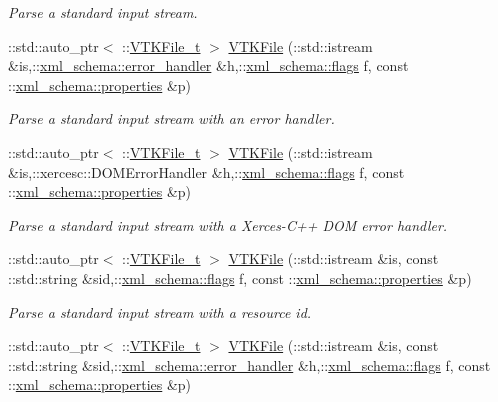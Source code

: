 \begin{DoxyCompactItemize}
\begin{DoxyCompactList}\small\item\em Parse a standard input stream. \end{DoxyCompactList}\item 
\+::std\+::auto\+\_\+ptr$<$ \+::\hyperlink{classVTKFile__t}{V\+T\+K\+File\+\_\+t} $>$ \hyperlink{vtk-unstructured_8cpp_ae23aec4e78c9498c7c876f961fa7cf89}{V\+T\+K\+File} (\+::std\+::istream \&is,\+::\hyperlink{namespacexml__schema_abdee01986b8e16f04af47dd12038261e}{xml\+\_\+schema\+::error\+\_\+handler} \&h,\+::\hyperlink{namespacexml__schema_a8d981c127a1f5106d04ad5853e707361}{xml\+\_\+schema\+::flags} f, const \+::\hyperlink{namespacexml__schema_aba199bc39c8b21c427369c27d2bcfc8c}{xml\+\_\+schema\+::properties} \&p)
\begin{DoxyCompactList}\small\item\em Parse a standard input stream with an error handler. \end{DoxyCompactList}\item 
\+::std\+::auto\+\_\+ptr$<$ \+::\hyperlink{classVTKFile__t}{V\+T\+K\+File\+\_\+t} $>$ \hyperlink{vtk-unstructured_8cpp_a973642863a68b619c0bca09536845eac}{V\+T\+K\+File} (\+::std\+::istream \&is,\+::xercesc\+::\+D\+O\+M\+Error\+Handler \&h,\+::\hyperlink{namespacexml__schema_a8d981c127a1f5106d04ad5853e707361}{xml\+\_\+schema\+::flags} f, const \+::\hyperlink{namespacexml__schema_aba199bc39c8b21c427369c27d2bcfc8c}{xml\+\_\+schema\+::properties} \&p)
\begin{DoxyCompactList}\small\item\em Parse a standard input stream with a Xerces-\/\+C++ D\+O\+M error handler. \end{DoxyCompactList}\item 
\+::std\+::auto\+\_\+ptr$<$ \+::\hyperlink{classVTKFile__t}{V\+T\+K\+File\+\_\+t} $>$ \hyperlink{vtk-unstructured_8cpp_a23832683b27b8e90f1ca393ddfe166f1}{V\+T\+K\+File} (\+::std\+::istream \&is, const \+::std\+::string \&sid,\+::\hyperlink{namespacexml__schema_a8d981c127a1f5106d04ad5853e707361}{xml\+\_\+schema\+::flags} f, const \+::\hyperlink{namespacexml__schema_aba199bc39c8b21c427369c27d2bcfc8c}{xml\+\_\+schema\+::properties} \&p)
\begin{DoxyCompactList}\small\item\em Parse a standard input stream with a resource id. \end{DoxyCompactList}\item 
\+::std\+::auto\+\_\+ptr$<$ \+::\hyperlink{classVTKFile__t}{V\+T\+K\+File\+\_\+t} $>$ \hyperlink{vtk-unstructured_8cpp_a9cf7007e58e8eefb16d14eab5ee97b36}{V\+T\+K\+File} (\+::std\+::istream \&is, const \+::std\+::string \&sid,\+::\hyperlink{namespacexml__schema_abdee01986b8e16f04af47dd12038261e}{xml\+\_\+schema\+::error\+\_\+handler} \&h,\+::\hyperlink{namespacexml__schema_a8d981c127a1f5106d04ad5853e707361}{xml\+\_\+schema\+::flags} f, const \+::\hyperlink{namespacexml__schema_aba199bc39c8b21c427369c27d2bcfc8c}{xml\+\_\+schema\+::properties} \&p)

\end{DoxyCompactItemize}
